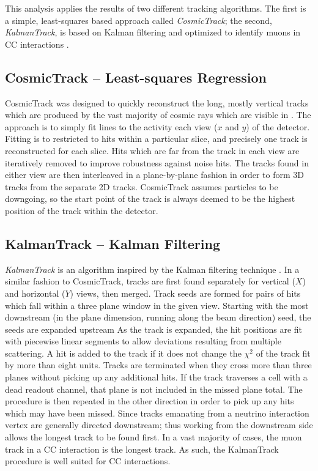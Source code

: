 This analysis applies the results of two different tracking algorithms.
The first is a simple, least-squares based approach called \textit{CosmicTrack};
the second, \textit{KalmanTrack}, is based on Kalman filtering
\cite{kalman1960new} and optimized to
identify muons in \numu CC interactions \cite{raddatz2016thesis}.

\subsection{CosmicTrack -- Least-squares Regression}
\label{cosmictrack_section}

CosmicTrack was designed to quickly reconstruct the long, mostly vertical tracks
which are produced by the vast majority of cosmic rays which are visible in
\nova.
The approach is to simply fit lines to the activity each view ($x$ and $y$)
of the detector.
Fitting is to restricted to hits within a particular slice, and precisely one
track is reconstructed for each slice.
Hits which are far from the track in each view are iteratively removed to
improve robustness against noise hits.
The tracks found in either view are then interleaved in a plane-by-plane fashion
in order to form 3D tracks from the separate 2D tracks.
CosmicTrack assumes particles to be downgoing, so the start point of the track
is always deemed to be the highest position of the track within the detector.


\subsection{KalmanTrack -- Kalman Filtering}
\label{kalmantrack_section}

\textit{KalmanTrack} \cite{raddatz2016thesis} is an algorithm inspired by
the Kalman filtering technique \cite{kalman1960new}.
In a similar fashion to CosmicTrack, tracks are first found separately for
vertical ($X$) and horizontal ($Y$) views, then merged.
Track seeds are formed for pairs of hits which fall within a
three plane window in the given view.
Starting with the most downstream (in the plane dimension, running along the
beam direction) seed, the seeds are expanded upstream
As the track is expanded, the hit positions are fit with piecewise linear
segments to allow deviations resulting from multiple scattering.
A hit is added to the track if it does not change the $\chi^2$ of
the track fit by more than eight units.
Tracks are terminated when they cross more than three planes without picking up
any additional hits.
If the track traverses a cell with a dead readout channel, that plane
is not included in the missed plane total.
The procedure is then repeated in the other direction in order to
pick up any hits which may have been missed.
Since tracks emanating from a neutrino interaction vertex are generally
directed downstream; thus working from the downstream side allows the longest
track to be found first.
In a vast majority of cases, the muon track in a \numu CC interaction
is the longest track.
As such, the KalmanTrack procedure is well suited for \numu CC interactions.

